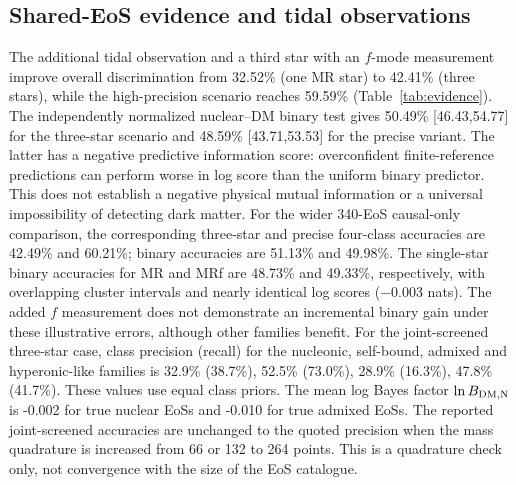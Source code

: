 \documentclass[11pt,a4paper]{article}
\begin{document}
\subsection{Shared-EoS evidence and tidal observations}
\begin{table}[htbp]\centering\small
\caption{Joint-screened catalogue: held-out shared-EoS evidence with 264 mass quadrature points. Accuracy in percent, with EoS-cluster bootstrap percentile intervals in brackets. The information scores $S_4,S_2$ are in nats. Four-class and binary baselines are 25\% and 50\%.}\label{tab:evidence}
\end{table}
The additional tidal observation and a third star with an $f$-mode measurement improve overall discrimination from 32.52\% (one MR star) to 42.41\% (three stars), while the high-precision scenario reaches 59.59\% (Table~\ref{tab:evidence}). The independently normalized nuclear--DM binary test gives 50.49\% [46.43,54.77] for the three-star scenario and 48.59\% [43.71,53.53] for the precise variant. The latter has a negative predictive information score: overconfident finite-reference predictions can perform worse in log score than the uniform binary predictor. This does not establish a negative physical mutual information or a universal impossibility of detecting dark matter. For the wider 340-EoS causal-only comparison, the corresponding three-star and precise four-class accuracies are 42.49\% and 60.21\%; binary accuracies are 51.13\% and 49.98\%. The single-star binary accuracies for MR and MRf are 48.73\% and 49.33\%, respectively, with overlapping cluster intervals and nearly identical log scores ($-0.003$ nats). The added $f$ measurement does not demonstrate an incremental binary gain under these illustrative errors, although other families benefit.
For the joint-screened three-star case, class precision (recall) for the nucleonic, self-bound, admixed and hyperonic-like families is 32.9\% (38.7\%), 52.5\% (73.0\%), 28.9\% (16.3\%), 47.8\% (41.7\%). These values use equal class priors. The mean log Bayes factor $\ln B_{\rm DM,N}$ is -0.002 for true nuclear EoSs and -0.010 for true admixed EoSs. The reported joint-screened accuracies are unchanged to the quoted precision when the mass quadrature is increased from 66 or 132 to 264 points. This is a quadrature check only, not convergence with the size of the EoS catalogue.
\end{document}

